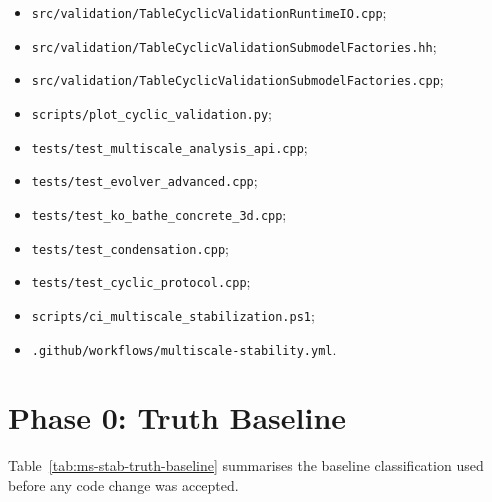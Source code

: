 \begin{itemize}
  \item \texttt{src/validation/TableCyclicValidationRuntimeIO.cpp};
  \item \texttt{src/validation/TableCyclicValidationSubmodelFactories.hh};
  \item \texttt{src/validation/TableCyclicValidationSubmodelFactories.cpp};
  \item \texttt{scripts/plot\_cyclic\_validation.py};
  \item \texttt{tests/test\_multiscale\_analysis\_api.cpp};
  \item \texttt{tests/test\_evolver\_advanced.cpp};
  \item \texttt{tests/test\_ko\_bathe\_concrete\_3d.cpp};
  \item \texttt{tests/test\_condensation.cpp};
  \item \texttt{tests/test\_cyclic\_protocol.cpp};
  \item \texttt{scripts/ci\_multiscale\_stabilization.ps1};
  \item \texttt{.github/workflows/multiscale-stability.yml}.
\end{itemize}

\section{Phase 0: Truth Baseline}
\label{sec:ms-stab-phase0}

Table~\ref{tab:ms-stab-truth-baseline} summarises the baseline classification
used before any code change was accepted.


